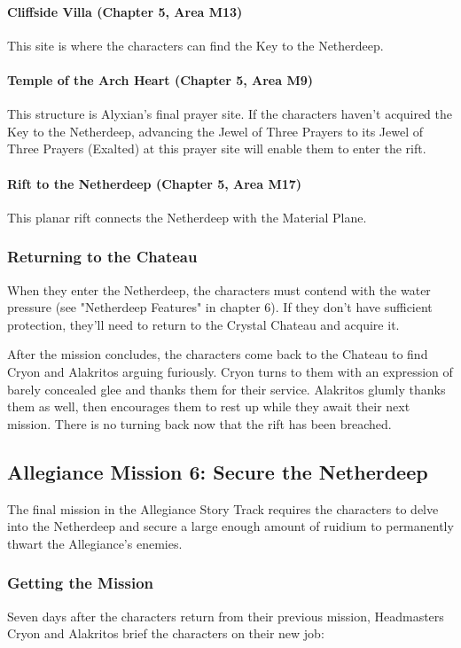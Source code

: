\documentclass[10pt,a4paper,twoside,bg=print,twocolumn,openany,nodeprecatedcode]{dndbook}
\begin{document}
\paragraph{Cliffside Villa (Chapter 5, Area M13)}
This site is where the characters can find the Key to the Netherdeep.

\paragraph{Temple of the Arch Heart (Chapter 5, Area M9)}
This structure is Alyxian's final prayer site. If the characters haven't acquired the Key to the Netherdeep, advancing the Jewel of Three Prayers to its Jewel of Three Prayers (Exalted) at this prayer site will enable them to enter the rift.

\paragraph{Rift to the Netherdeep (Chapter 5, Area M17)}
This planar rift connects the Netherdeep with the Material Plane.

\subsubsection{Returning to the Chateau}
When they enter the Netherdeep, the characters must contend with the water pressure (see "Netherdeep Features" in chapter 6). If they don't have sufficient protection, they'll need to return to the Crystal Chateau and acquire it.

After the mission concludes, the characters come back to the Chateau to find Cryon and Alakritos arguing furiously. Cryon turns to them with an expression of barely concealed glee and thanks them for their service. Alakritos glumly thanks them as well, then encourages them to rest up while they await their next mission. There is no turning back now that the rift has been breached.

\subsection{Allegiance Mission 6: Secure the Netherdeep}
The final mission in the Allegiance Story Track requires the characters to delve into the Netherdeep and secure a large enough amount of ruidium to permanently thwart the Allegiance's enemies.

\subsubsection{Getting the Mission}
Seven days after the characters return from their previous mission, Headmasters Cryon and Alakritos brief the characters on their new job:
\end{document}
